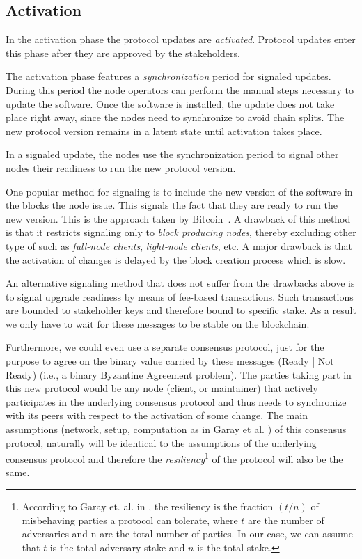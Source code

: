 \documentclass[11pt,a4paper]{article}
\begin{document}
\subsection{Activation}
\label{sec:activation}

In the activation phase the protocol updates are \emph{activated}. Protocol
updates enter this phase after they are approved by the stakeholders.

The activation phase features a \emph{synchronization} period for signaled
updates. During this period the node operators can perform the manual steps
necessary to update the software. Once the software is installed, the update
does not take place right away, since the nodes need to synchronize to avoid
chain splits. The new protocol version remains in a latent state until
activation takes place.

In a signaled update, the nodes use the synchronization period to signal other
nodes their readiness to run the new protocol version.

One popular method for signaling is to include the new version of the software
in the blocks the node issue. This signals the fact that they are ready to run
the new version. This is the approach taken by Bitcoin~\cite{bitcoin}. A
drawback of this method is that it restricts signaling only to \emph{block
  producing nodes}, thereby excluding other type of such as \emph{full-node
  clients}, \emph{light-node clients}, etc. A major drawback is that the
activation of changes is delayed by the block creation process which is slow.

An alternative signaling method that does not suffer from the drawbacks above is
to signal upgrade readiness by means of fee-based transactions. Such
transactions are bounded to stakeholder keys and therefore bound to specific
stake.
%
As a result we only have to wait for these messages to be stable on the
blockchain.

Furthermore, we could even use a separate consensus protocol, just for the
purpose to agree on the binary value carried by these messages (Ready | Not
Ready) (i.e., a binary Byzantine Agreement problem). The parties taking part in
this new protocol would be any node (client, or maintainer) that actively
participates in the underlying consensus protocol and thus needs to synchronize
with its peers with respect to the activation of some change. The main
assumptions (network, setup, computation as in Garay et al. \cite{sok}) of this
consensus protocol, naturally will be identical to the assumptions of the
underlying consensus protocol and therefore the
\emph{resiliency}\footnote{According to Garay et. al. in \cite{sok}, the
  resiliency is the fraction $(t/n)$ of misbehaving parties a protocol can
  tolerate, where $t$ are the number of adversaries and n are the total number
  of parties. In our case, we can assume that $t$ is the total adversary stake
  and $n$ is the total stake.} of the protocol will also be the same.
\end{document}
